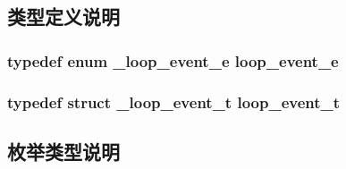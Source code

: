 \subsection{类型定义说明}
\hypertarget{a00062_ab92fe4e788615cfd56530167651a8ff4_ab92fe4e788615cfd56530167651a8ff4}{}
\subsubsection[{loop\+\_\+event\+\_\+e}]{\setlength{\rightskip}{0pt plus 5cm}typedef enum {\bf \+\_\+loop\+\_\+event\+\_\+e}  {\bf loop\+\_\+event\+\_\+e}}\label{a00062_ab92fe4e788615cfd56530167651a8ff4_ab92fe4e788615cfd56530167651a8ff4}
\hypertarget{a00062_a1095ee772017ce29dcac0987c456709e_a1095ee772017ce29dcac0987c456709e}{}
\subsubsection[{loop\+\_\+event\+\_\+t}]{\setlength{\rightskip}{0pt plus 5cm}typedef struct {\bf \+\_\+loop\+\_\+event\+\_\+t}  {\bf loop\+\_\+event\+\_\+t}}\label{a00062_a1095ee772017ce29dcac0987c456709e_a1095ee772017ce29dcac0987c456709e}


\subsection{枚举类型说明}
\hypertarget{a00062_a19ff97cc6f736cb864d4e4b6ca60989d_a19ff97cc6f736cb864d4e4b6ca60989d}{}

